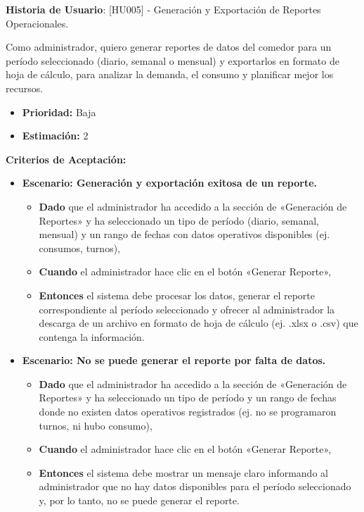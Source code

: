 \documentclass[12pt]{article}
\begin{document}
\textbf{Historia de Usuario}: [HU005] - Generación y Exportación de Reportes Operacionales.

Como administrador, quiero generar reportes de datos del comedor para un período seleccionado (diario, semanal o mensual) y exportarlos en formato de hoja de cálculo, para analizar la demanda, el consumo y planificar mejor los recursos.

\begin{itemize}
    \item \textbf{Prioridad:} Baja
    \item \textbf{\textbf{Estimación:}} 2
\end{itemize}

\textbf{Criterios de Aceptación:}
\begin{itemize}
    \item \textbf{Escenario: Generación y exportación exitosa de un reporte.}
    \begin{itemize}
        \item \textbf{Dado} que el administrador ha accedido a la sección de «Generación de \\ Reportes» y ha seleccionado un tipo de período (diario, semanal, mensual) y un rango de fechas con datos operativos disponibles (ej. consumos, turnos),
        \item \textbf{Cuando} el administrador hace clic en el botón «Generar Reporte»,
        \item \textbf{Entonces} el sistema debe procesar los datos, generar el reporte correspondiente al período seleccionado y ofrecer al administrador la descarga de un archivo en formato de hoja de cálculo (ej. .xlsx o .csv) que contenga la información.
    \end{itemize}

    \item \textbf{Escenario: No se puede generar el reporte por falta de datos.}
    \begin{itemize}
        \item \textbf{Dado} que el administrador ha accedido a la sección de «Generación de Reportes» y ha seleccionado un tipo de período y un rango de fechas donde no existen datos operativos registrados (ej. no se programaron turnos, ni hubo consumo),
        \item \textbf{Cuando} el administrador hace clic en el botón «Generar Reporte»,
        \item \textbf{Entonces} el sistema debe mostrar un mensaje claro informando al administrador que no hay datos disponibles para el período seleccionado y, por lo tanto, no se puede generar el reporte.
    \end{itemize}
\end{itemize}
\end{document}
